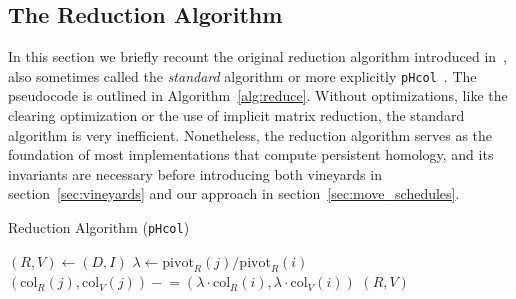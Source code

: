 \documentclass{siamart190516}
\begin{document}
\subsection{The Reduction Algorithm}\label{sec:reduction}
In this section we briefly recount the original reduction algorithm introduced in~\cite{zomorodian2005computing}, also sometimes called the \emph{standard} algorithm or more explicitly \texttt{pHcol}~\cite{de2011dualities}. 
The pseudocode is outlined in Algorithm~\ref{alg:reduce}. Without optimizations, like the clearing optimization or the use of implicit matrix reduction, the standard  algorithm is very inefficient. Nonetheless, the reduction algorithm serves as the foundation of most implementations that compute persistent homology, and its invariants are necessary before introducing both vineyards in section~\ref{sec:vineyards} and our approach in section~\ref{sec:move_schedules}.

\begin{algorithm}[t]
	\caption{Reduction Algorithm (\texttt{pHcol}) }
	\begin{algorithmic}[1]
		\State $(R, V) \gets (D, I)$
				\State $\lambda \gets \mathrm{pivot}_R(j)/\mathrm{pivot}_R(i)$
				\State $(\mathrm{col}_R(j), \mathrm{col}_V(j)) \mathrel{-}= \left ( \lambda \cdot \mathrm{col}_R(i), \lambda \cdot \mathrm{col}_V(i) \right )$
			\EndWhile
		\EndFor 
		\State \Return $(R, V)$
		\EndFunction
	\end{algorithmic}	\label{alg:reduce}
\end{algorithm}
\end{document}
